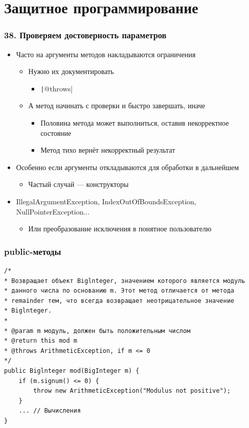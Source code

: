 \documentclass[xetex,mathserif,serif]{beamer}
\begin{document}
	\section{Защитное программирование}

	\begin{frame}
		\frametitle{38. Проверяем достоверность параметров}
		\begin{itemize}
			\item Часто на аргументы методов накладываются ограничения
			\begin{itemize}
				\item Нужно их документировать
				\begin{itemize}
					\item \texttt|@throws|
				\end{itemize}
				\item А метод начинать с проверки и быстро завершать, иначе
				\begin{itemize}
					\item Половина метода может выполниться, оставив некорректное состояние
					\item Метод тихо вернёт некорректный результат
				\end{itemize}
			\end{itemize}
			\item Особенно если аргументы откладываются для обработки в дальнейшем
			\begin{itemize}
				\item Частый случай --- конструкторы
			\end{itemize}
			\item IllegalArgumentException, IndexOutOfBoundsException, NullPointerException...
			\begin{itemize}
				\item Или преобразование исключения в понятное пользователю
			\end{itemize}
		\end{itemize}
	\end{frame}

	\begin{frame}[fragile]
		\frametitle{public-методы}
		\begin{small}
			\begin{verbatim}
/*
* Возвращает объект Biglnteger, значением которого является модуль 
* данного числа по основанию m. Этот метод отличается от метода 
* remainder тем, что всегда возвращает неотрицательное значение 
* Biglnteger.
*
* @раrаm m модуль, должен быть положительным числом
* @return this mod m
* @throws ArithmeticException, if m <= 0
*/
public Biglnteger mod(BigInteger m) {
    if (m.signum() <= 0) {
        throw new ArithmeticException("Modulus not positive");
    }
    ... // Вычисления
}
			\end{verbatim}
		\end{small}
	\end{frame}
\end{document}
